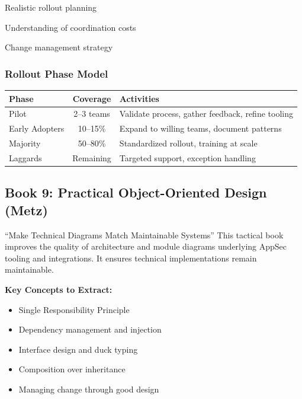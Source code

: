 \documentclass[11pt,letterpaper]{article}
\begin{document}
\begin{stakeholderbox}
\begin{description}[nosep, leftmargin=3cm]
    \item[Program/Project Leadership] Realistic rollout planning
    \item[Eng Leadership] Understanding of coordination costs
    \item[AppSec Lead] Change management strategy
\end{description}
\end{stakeholderbox}

\subsubsection{Rollout Phase Model}

\begin{center}
\renewcommand{\arraystretch}{1.3}
\begin{tabular}{lcp{6.5cm}}
\toprule
\textbf{Phase} & \textbf{Coverage} & \textbf{Activities} \\
\midrule
Pilot & 2--3 teams & Validate process, gather feedback, refine tooling \\
Early Adopters & 10--15\% & Expand to willing teams, document patterns \\
Majority & 50--80\% & Standardized rollout, training at scale \\
Laggards & Remaining & Targeted support, exception handling \\
\bottomrule
\end{tabular}
\end{center}

\newpage

\subsection{Book 9: Practical Object-Oriented Design (Metz)}

\begin{bookbox}{``Make Technical Diagrams Match Maintainable Systems''}
This tactical book improves the quality of architecture and module diagrams underlying AppSec tooling and integrations. It ensures technical implementations remain maintainable.

\vspace{0.5cm}

\textbf{Key Concepts to Extract:}
\begin{itemize}[nosep]
    \item Single Responsibility Principle
    \item Dependency management and injection
    \item Interface design and duck typing
    \item Composition over inheritance
    \item Managing change through good design
\end{itemize}
\end{bookbox}
\end{document}
